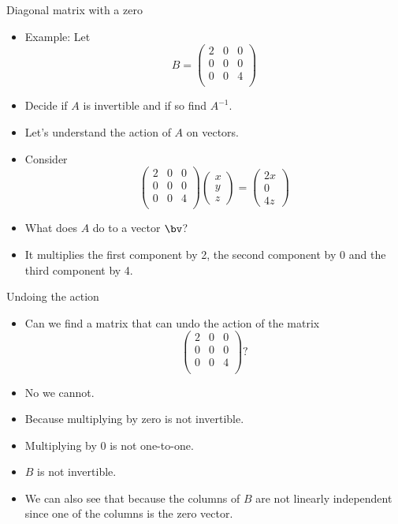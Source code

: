 \documentclass{beamer}
\begin{document}
\begin{frame}{Diagonal matrix with a zero}

\begin{itemize}
\item Example: Let
$$
B =
\begin{pmatrix}
2 & 0 & 0 \\
0 & 0 & 0 \\
0 & 0 & 4 \\
\end{pmatrix}
$$
\item Decide if $A$ is invertible and if so find $A^{-1}$.
\item Let's understand the action of $A$ on vectors.
\item Consider
$$
\begin{pmatrix}
2 & 0 & 0 \\
0 & 0 & 0 \\
0 & 0 & 4 \\
\end{pmatrix}
\begin{pmatrix}
x \\ y \\ z
\end{pmatrix}
=
\begin{pmatrix}
2x \\ 0 \\ 4z
\end{pmatrix}
$$
\item What does $A$ do to a vector $\bv$?
\item It multiplies the first component by 2, the second component by 0
and the third component by 4.
\end{itemize}
\end{frame}

\begin{frame}{Undoing the action}

\begin{itemize}
\item Can we find a matrix that can undo the action of the matrix
$$
\begin{pmatrix}
2 & 0 & 0 \\
0 & 0 & 0 \\
0 & 0 & 4 \\
\end{pmatrix}
?
$$
\item No we cannot.
\item Because multiplying by zero is not invertible.
\item Multiplying by 0 is not one-to-one.
\item $B$ is not invertible.
\item We can also see that because the columns of $B$ are not
linearly independent since one of the columns is the zero vector.
\end{itemize}
\end{frame}
\end{document}
